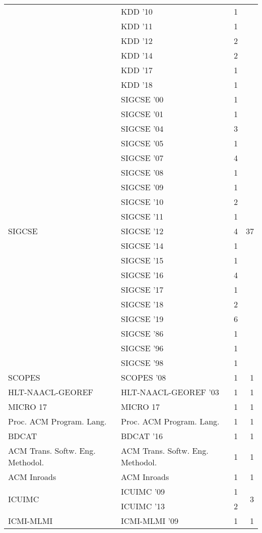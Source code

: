 \begin{table*}[t]
\begin{tabular}{llrr}
& KDD '10 & 1 &\\
& KDD '11 & 1 &\\
& KDD '12 & 2 &\\
& KDD '14 & 2 &\\
& KDD '17 & 1 &\\
& KDD '18 & 1 &\\
\multirow{19}{*}{SIGCSE } & SIGCSE '00 & 1 & \multirow{19}{*}{37}\\
& SIGCSE '01 & 1 &\\
& SIGCSE '04 & 3 &\\
& SIGCSE '05 & 1 &\\
& SIGCSE '07 & 4 &\\
& SIGCSE '08 & 1 &\\
& SIGCSE '09 & 1 &\\
& SIGCSE '10 & 2 &\\
& SIGCSE '11 & 1 &\\
& SIGCSE '12 & 4 &\\
& SIGCSE '14 & 1 &\\
& SIGCSE '15 & 1 &\\
& SIGCSE '16 & 4 &\\
& SIGCSE '17 & 1 &\\
& SIGCSE '18 & 2 &\\
& SIGCSE '19 & 6 &\\
& SIGCSE '86 & 1 &\\
& SIGCSE '96 & 1 &\\
& SIGCSE '98 & 1 &\\
\multirow{1}{*}{SCOPES } & SCOPES '08 & 1 & \multirow{1}{*}{1}\\
\multirow{1}{*}{HLT-NAACL-GEOREF } & HLT-NAACL-GEOREF '03 & 1 & \multirow{1}{*}{1}\\
\multirow{1}{*}{MICRO 17} & MICRO 17 & 1 & \multirow{1}{*}{1}\\
\multirow{1}{*}{Proc. ACM Program. Lang.} & Proc. ACM Program. Lang. & 1 & \multirow{1}{*}{1}\\
\multirow{1}{*}{BDCAT } & BDCAT '16 & 1 & \multirow{1}{*}{1}\\
\multirow{1}{*}{ACM Trans. Softw. Eng. Methodol.} & ACM Trans. Softw. Eng. Methodol. & 1 & \multirow{1}{*}{1}\\
\multirow{1}{*}{ACM Inroads} & ACM Inroads & 1 & \multirow{1}{*}{1}\\
\multirow{2}{*}{ICUIMC } & ICUIMC '09 & 1 & \multirow{2}{*}{3}\\
& ICUIMC '13 & 2 &\\
\multirow{1}{*}{ICMI-MLMI } & ICMI-MLMI '09 & 1 & \multirow{1}{*}{1}\\

\end{tabular}
\end{table*}
